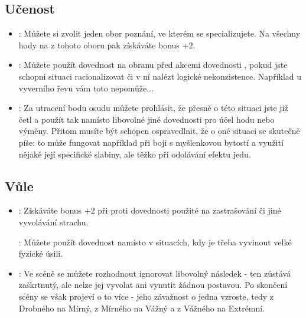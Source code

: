 \subsection{Učenost}
\label{sec:trik-ucenost}
\begin{itemize}
  
\item{}:
\label{sec:ucenost-specialista}
Můžete si zvolit jeden obor poznání, ve kterém se specializujete. Na všechny hody na  z tohoto oboru pak získáváte bonus +2.

\item{}:
\label{sec:ucenost-smysl}
Můžete použít dovednost  na obranu před akcemi dovednosti , pokud jste schopni situaci racionalizovat či v ní nalézt logické nekonzistence. Například u vyverního řevu vám toto nepomůže...

\item{}:
\label{sec:ucenost-cetl}
Za utracení bodu osudu můžete prohlásit, že přesně o této situaci jste již četl a použít tak  namísto libovolné jiné dovednosti pro účel hodu nebo výměny. Přitom musíte být schopen ospravedlnit, že o oné situaci se skutečně píše: to může fungovat například při boji s myšlenkovou bytostí a využití nějaké její specifické slabiny, ale těžko při odolávání efektu jedu.
\end{itemize}

\subsection{Vůle}
\label{sec:trik-vule}
\begin{itemize}
  
\item{}
\label{sec:vule-nebojsa}:
Získáváte bonus +2 při  proti dovednosti  použité na zastrašování či jiné vyvolávání strachu.

:
\label{sec:vule-duch}
Můžete použít dovednost  namísto  v situacích, kdy je třeba vyvinout velké fyzické úsilí.

\item{}:
\label{sec:vule-ublizit}
Ve scéně se můžete rozhodnout ignorovat libovolný následek - ten zůstává zaškrtnutý, ale nelze jej vyvolat ani vynutit žádnou postavou. Po skončení scény se však projeví o to více - jeho závažnost o jedna vzroste, tedy z Drobného na Mírný, z Mírného na Vážný a z Vážného na Extrémní.
\end{itemize}


